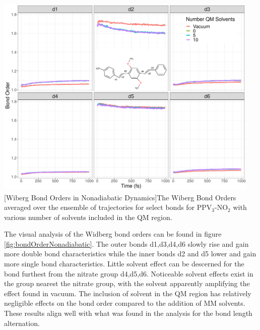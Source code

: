 \noindent
\begin{minipage}[c]{\textwidth}
  \centering
  \includegraphics[width=5in]{../Paper2/Images/bond_order/solvent_comparison.png}
  [Wiberg Bond Orders in Nonadiabatic Dynamics]{The Wiberg Bond Orders averaged over the ensemble of trajectories for select bonds for PPV\(_3\)-NO\(_2\) with various number of solvents included in the QM region.}
  \label{fig:bondOrderNonadiabatic}
\end{minipage}\bigskip

The visual analysis of the Widberg bond orders can be found in figure \ref{fig:bondOrderNonadiabatic}.
The outer bonds d1,d3,d4,d6 slowly rise and gain more double bond characteristics while the inner bonds d2 and d5 lower and gain more single bond characteristics.
Little solvent effect can be descerned for the bond furthest from the nitrate group d4,d5,d6.
Noticeable solvent effects exist in the group nearest the nitrate group, with the solvent apparently amplifying the effect found in vacuum.
The inclusion of solvent in the QM region has relatively negligible effects on the bond order compared to the addition of MM solvents.
These results align well with what was found in the analysis for the bond length alternation.
